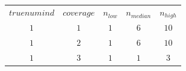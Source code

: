 \begin{table}[H]
\begin{tabular}{ccccc}
$truenumind$ & $coverage$ & $n_{low}$ & $n_{median}$ & $n_{high}$\\
$1$ & $1$ & $1$ & $6$ & $10$\\
$1$ & $2$ & $1$ & $6$ & $10$\\
$1$ & $3$ & $1$ & $1$ & $3$\\
\end{tabular}
\end{table}
 